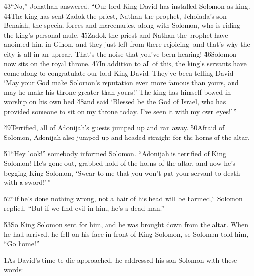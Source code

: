 \v{43}``No,'' Jonathan answered. ``Our lord King David has installed Solomon as king. \v{44}The king has sent Zadok the priest, Nathan the prophet, Jehoiada's son Benaiah, the special forces and mercenaries, along with Solomon, who is riding the king's personal mule. \v{45}Zadok the priest and Nathan the prophet have anointed him in Gihon, and they just left from there rejoicing, and that's why the city is all in an uproar. That's the noise that you've been hearing! \v{46}Solomon now sits on the royal throne. \v{47}In addition to all of this, the king's servants have come along to congratulate our lord King David. They've been telling David `May your God make Solomon's reputation even more famous than yours, and may he make his throne greater than yours!' The king has himself bowed in worship on his own bed \v{48}and said `Blessed be the  God of Israel, who has provided someone to sit on my throne today. I've seen it with my own eyes!'\,''

\v{49}Terrified, all of Adonijah's guests jumped up and ran away. \v{50}Afraid of Solomon, Adonijah also jumped up and headed straight for the horns of the altar.

\v{51}``Hey look!'' somebody informed Solomon. ``Adonijah is terrified of King Solomon! He's gone out, grabbed hold of the horns of the altar, and now he's begging King Solomon, `Swear to me that you won't put your servant to death with a sword!'\,''

\v{52}``If he's done nothing wrong, not a hair of his head will be harmed,'' Solomon replied. ``But if we find evil in him, he's a dead man.''

\v{53}So King Solomon sent for him, and he was brought down from the altar. When he had arrived, he fell on his face in front of King Solomon, so Solomon told him, ``Go home!''

\v{1}As David's time to die approached, he addressed his son Solomon with these words:

